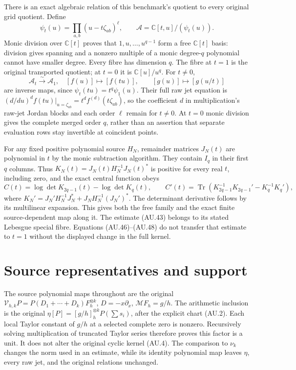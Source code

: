 \documentclass[11pt]{article}
\newcommand{\C}{\mathbb C}
\newcommand{\Tr}{\operatorname{Tr}}
\begin{document}
There is an exact algebraic relation of this benchmark's quotient to
every original grid quotient. Define
\[
 \psi_t(u)=\prod_{a,b}(u-t\zeta_{ab})^\ell,
 \qquad \mathcal A=\C[t,u]/(\psi_t(u)).                    \tag{AU.46}
\]
Monic division over $\C[t]$ proves that $1,u,\ldots,u^{q-1}$
form a free $\C[t]$ basis: division gives spanning and a nonzero
multiple of a monic degree-$q$ polynomial cannot have smaller degree.
Every fibre has dimension $q$. The fibre at $t=1$ is the original
transported quotient; at $t=0$ it is $\C[u]/u^q$. For $t\ne0$,
\[
 \mathcal A_t\xrightarrow{\sim}\mathcal A_1,
 \quad[f(u)]\longmapsto[f(tu)],\qquad
 [g(u)]\longmapsto[g(u/t)]                              \tag{AU.47}
\]
are inverse maps, since $\psi_t(tu)=t^q\psi_1(u)$.
Their full raw jet equation is
$(d/du)^d f(tu)|_{u=\zeta_{ab}}=t^df^{(d)}(t\zeta_{ab})$,
so the coefficient $d$ in multiplication's raw-jet Jordan blocks
and each order $\ell$ remain for $t\ne0$. At $t=0$ monic division
gives the complete merged order $q$, rather than an assertion that
separate evaluation rows stay invertible at coincident points.

For any fixed positive polynomial source $H_N$, remainder matrices
$J_N(t)$ are polynomial in $t$ by the monic subtraction algorithm.
They contain $I_q$ in their first $q$ columns. Thus
$K_N(t)=J_N(t)H_N^{-1}J_N(t)^*$ is positive for every real $t$,
including zero, and the exact central function obeys
\[
 C(t)=\log\det K_{2q-1}(t)-\log\det K_q(t),\qquad
 C'(t)=\Tr(K_{2q-1}^{-1}K_{2q-1}'-K_q^{-1}K_q'),
 \tag{AU.48}
\]
where $K_N'=J_N'H_N^{-1}J_N^*+J_NH_N^{-1}(J_N')^*$.
The determinant derivative follows by its multilinear expansion.
This gives both the free family and the exact finite source-dependent
map along it. The estimate (AU.43) belongs to its stated Lebesgue
special fibre. Equations (AU.46)--(AU.48) do not transfer that estimate
to $t=1$ without the displayed change in the full kernel.

\section{Source representatives and support}

The source polynomial maps throughout are the original
$\mathcal V_{h,k}P=P(D_1+\cdots+D_k)F_h^{\otimes k}$,
$D=-x\partial_x$, $\mathcal MF_h=g/h$.
The arithmetic inclusion is the original
$\eta[P]=[g/h]_h^{\otimes k}P(\sum s_i)$, after the explicit
chart (AU.2). Each local Taylor constant of $g/h$ at a selected
complete zero is nonzero. Recursively solving multiplication of
truncated Taylor series therefore proves this factor is a unit.
It does not alter the original cyclic kernel (AU.4).
The comparison to $\nu_k$ changes the norm used in an estimate,
while its identity polynomial map leaves $\eta$, every raw jet,
and the original relations unchanged.
\end{document}
